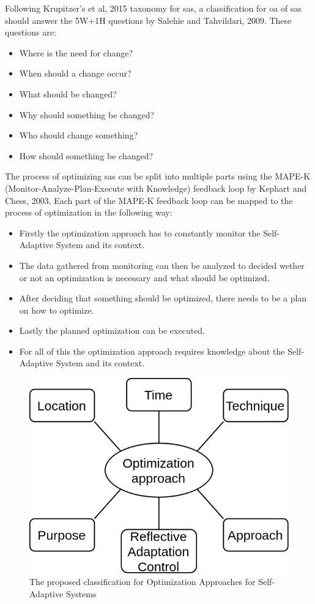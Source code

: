 Following Krupitzer's et al, 2015\cite*{SurveyOnEngineeringApproaches} taxonomy for \acrlong{sas},
a classification for \acrlong{oa} of \acrshort{sas} should answer 
the 5W+1H questions by Salehie and Tahvildari, 2009\cite*{LandscapeAndResearchChallenges}.
These questions are:
\begin{itemize}
    \item Where is the need for change?
    \item When should a change occur?
    \item What should be changed?
    \item Why should something be changed?
    \item Who should change something?
    \item How should something be changed?
\end{itemize}

The process of optimizing \acrlong{sas} can be split into multiple parts 
using the MAPE-K (Monitor-Analyze-Plan-Execute with Knowledge) feedback loop by Kephart and Chess, 2003\cite*{VisionOfAutonomicComputing}.
Each part of the MAPE-K feedback loop can be mapped to the process of optimization in the following way:
\begin{itemize}
    \item Firstly the optimization approach has to constantly monitor the Self-Adaptive System and its context.
    \item The data gathered from monitoring can then be analyzed to decided wether or not an optimization is necessary and what should be optimized.
    \item After deciding that something should be optimized, there needs to be a plan on how to optimize.
    \item Lastly the planned optimization can be executed.
    \item For all of this the optimization approach requires knowledge about the Self-Adaptive System and its context.
\end{itemize}


\begin{figure}
    \centering
    \includegraphics[width=0.6\columnwidth]{images/ClassificationProposal-Proposal.png}
    \caption{The proposed classification for Optimization Approaches for Self-Adaptive Systems}
\end{figure}


